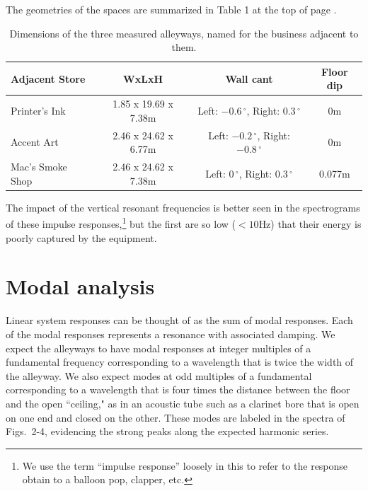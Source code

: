 \documentclass{aes137}
\renewcommand{\deg}{\,^{\circ}}
\begin{document}
The geometries of the spaces are summarized in Table 1 at the top of page
\pageref{table:geometries}. 

\begin{table}
\begin{center} 
\begin{tabular}{|l|c|c|c|}
\hline
\textbf{Adjacent Store} & \textbf{WxLxH} & \textbf{Wall cant} & \textbf{Floor dip} \\
\hline
Printer's Ink & 1.85 x 19.69 x 7.38m & Left: $-0.6\deg$, Right: $0.3\deg$ & 0m \\
\hline
Accent Art & 2.46 x 24.62 x 6.77m & Left: $-0.2\deg$, Right: $-0.8\deg$ & 0m \\
\hline
Mac's Smoke Shop & 2.46 x 24.62 x 7.38m & Left: $0\deg$, Right: $0.3\deg$ & 0.077m \\
\hline
\end{tabular} \caption{Dimensions of the three measured alleyways, named for the business adjacent to them.}
\end{center}
\label{table:geometries}
\end{table}

	
The impact of the vertical resonant frequencies is better seen in the
spectrograms of these impulse responses,\footnote{We use the term
  ``impulse response'' loosely in this to refer to the response obtain
  to a balloon pop, clapper, etc.}  but the first are so low ($<10$Hz)
that their energy is poorly captured by the equipment.



\section{Modal analysis}

Linear system responses can be thought of as the sum of modal
responses. Each of the modal responses represents a resonance with
associated damping. We expect the alleyways to have modal responses at
integer multiples of a fundamental frequency corresponding to a
wavelength that is twice the width of the alleyway.  We also expect
modes at odd multiples of a fundamental corresponding to a wavelength
that is four times the distance between the floor and the open
``ceiling," as in an acoustic tube such as a clarinet bore that is
open on one end and closed on the other. These modes are labeled in
the spectra of Figs.~2-4, evidencing the strong peaks along the
expected harmonic series.
\end{document}

